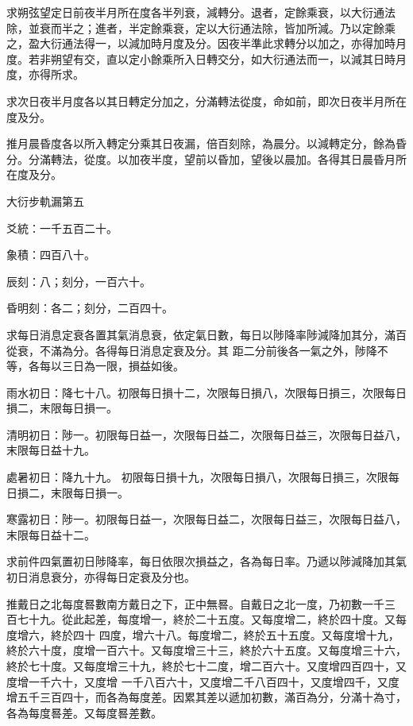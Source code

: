 \begin{pinyinscope}
 求朔弦望定日前夜半月所在度各半列衰，減轉分。退者，定餘乘衰，以大衍通法除，並衰而半之；進者，半定餘乘衰，定以大衍通法除，皆加所減。乃以定餘乘之，盈大衍通法得一，以減加時月度及分。因夜半準此求轉分以加之，亦得加時月度。若非朔望有交，直以定小餘乘所入日轉交分，如大衍通法而一，以減其日時月度，亦得所求。



 求次日夜半月度各以其日轉定分加之，分滿轉法從度，命如前，即次日夜半月所在度及分。



 推月晨昏度各以所入轉定分乘其日夜漏，倍百刻除，為晨分。以減轉定分，餘為昏分。分滿轉法，從度。以加夜半度，望前以昏加，望後以晨加。各得其日晨昏月所在度及分。



 大衍步軌漏第五



 爻統：一千五百二十。



 象積：四百八十。



 辰刻：八；刻分，一百六十。



 昏明刻：各二；刻分，二百四十。



 求每日消息定衰各置其氣消息衰，依定氣日數，每日以陟降率陟減降加其分，滿百從衰，不滿為分。各得每日消息定衰及分。其
 距二分前後各一氣之外，陟降不等，各每以三日為一限，損益如後。



 雨水初日：降七十八。初限每日損十二，次限每日損八，次限每日損三，次限每日損二，末限每日損一。



 清明初日：陟一。初限每日益一，次限每日益二，次限每日益三，次限每日益八，末限每日益十九。



 處暑初日：降九十九。
 初限每日損十九，次限每日損八，次限每日損三，次限每日損二，末限每日損一。



 寒露初日：陟一。初限每日益一，次限每日益二，次限每日益三，次限每日益八，末限每日益十二。



 求前件四氣置初日陟降率，每日依限次損益之，各為每日率。乃遞以陟減降加其氣初日消息衰分，亦得每日定衰及分也。



 推戴日之北每度晷數南方戴日之下，正中無晷。自戴日之北一度，乃初數一千三
 百七十九。從此起差，每度增一，終於二十五度。又每度增二，終於四十度。又每度增六，終於四十
 四度，增六十八。每度增二，終於五十五度。又每度增十九，
 終於六十度，度增一百六十。又每度增三十三，終於六十五度。又每度增三十六，終於七十度。又每度增三十九，終於七十二度，增二百六十。又度增四百四十，又度增一千六十，又度增
 一千八百六十，又度增二千八百四十，又度增四千，又度增五千三百四十，而各為每度差。因累其差以遞加初數，滿百為分，分滿十為寸，
 各為每度晷差。又每度晷差數。




\end{pinyinscope}
